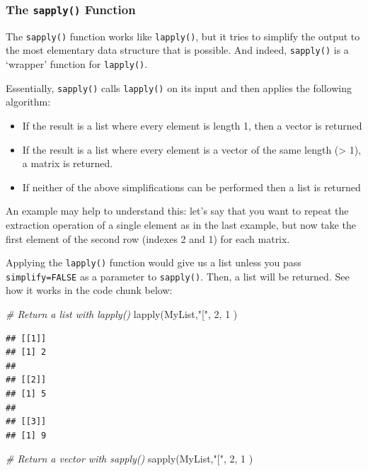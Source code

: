 \documentclass[
]{book}
\newenvironment{Shaded}{\begin{snugshade}}{\end{snugshade}}
\newcommand{\CommentTok}[1]{\textcolor[rgb]{0.56,0.35,0.01}{\textit{#1}}}
\newcommand{\DecValTok}[1]{\textcolor[rgb]{0.00,0.00,0.81}{#1}}
\newcommand{\FunctionTok}[1]{\textcolor[rgb]{0.00,0.00,0.00}{#1}}
\newcommand{\NormalTok}[1]{#1}
\newcommand{\StringTok}[1]{\textcolor[rgb]{0.31,0.60,0.02}{#1}}
\providecommand{\tightlist}{%
  \setlength{\itemsep}{0pt}\setlength{\parskip}{0pt}}
\begin{document}
\hypertarget{the-sapply-function}{%
\subsubsection{\texorpdfstring{The \texttt{sapply()} Function}{The sapply() Function}}\label{the-sapply-function}}

The \texttt{sapply()} function works like \texttt{lapply()}, but it tries to simplify the output to the most elementary data structure that is possible. And indeed, \texttt{sapply()} is a `wrapper' function for \texttt{lapply()}.

Essentially, \texttt{sapply()} calls \texttt{lapply()} on its input and then applies the following algorithm:

\begin{itemize}
\tightlist
\item
  If the result is a list where every element is length 1, then a vector is returned
\item
  If the result is a list where every element is a vector of the same length (\textgreater{} 1), a matrix is returned.
\item
  If neither of the above simplifications can be performed then a list is returned
\end{itemize}

An example may help to understand this: let's say that you want to repeat the extraction operation of a single element as in the last example, but now take the first element of the second row (indexes 2 and 1) for each matrix.

Applying the \texttt{lapply()} function would give us a list unless you pass \texttt{simplify=FALSE} as a parameter to \texttt{sapply()}. Then, a list will be returned. See how it works in the code chunk below:

\begin{Shaded}
\begin{Highlighting}[]
\CommentTok{\# Return a list with \textasciigrave{}lapply()\textasciigrave{}}
\FunctionTok{lapply}\NormalTok{(MyList,}\StringTok{"["}\NormalTok{, }\DecValTok{2}\NormalTok{, }\DecValTok{1}\NormalTok{ )}
\end{Highlighting}
\end{Shaded}

\begin{verbatim}
## [[1]]
## [1] 2
## 
## [[2]]
## [1] 5
## 
## [[3]]
## [1] 9
\end{verbatim}

\begin{Shaded}
\begin{Highlighting}[]
\CommentTok{\# Return a vector with \textasciigrave{}sapply()\textasciigrave{}}
\FunctionTok{sapply}\NormalTok{(MyList,}\StringTok{"["}\NormalTok{, }\DecValTok{2}\NormalTok{, }\DecValTok{1}\NormalTok{ )}
\end{Highlighting}
\end{Shaded}
\end{document}
